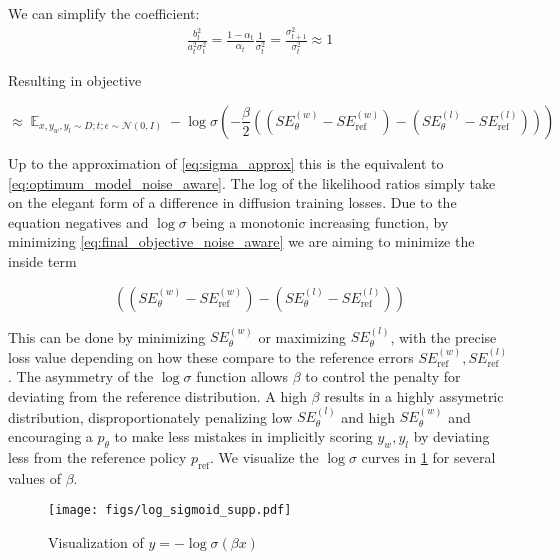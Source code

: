 \documentclass[10pt,twocolumn,letterpaper]{article}
\newcommand{\pref}{p_{\text{ref}}}
\begin{document}
We can simplify the coefficient:
\begin{align}\label{eq:sigma_approx}
\frac{b_t^2}{a_t^2 \sigma_t^2} =  \frac{1 - \alpha_t}{\alpha_t}\frac{1}{\sigma_t^2} = \frac{\sigma^2_{t+1}}{\sigma^2_t}
\approx 1\end{align}

Resulting in objective

\begin{equation}\label{eq:final_objective_noise_aware}
    \approx \mathop{\mathbb{E}}_{x,y_w,y_l \sim D; t; \epsilon \sim \mathcal{N}(0, I)}   
    - \log \sigma \left( -  \frac{\beta}{2} \left( (SE_\theta^{(w)} - SE_{\text{ref}}^{(w)} ) - (SE_\theta^{(l)} - SE_{\text{ref}}^{(l)} ) \right)    \right) 
\end{equation}

Up to the approximation of \cref{eq:sigma_approx} this is the equivalent to \cref{eq:optimum_model_noise_aware}. The log of the likelihood ratios simply take on the elegant form of a difference in diffusion training losses. Due to the equation negatives and $\log \sigma$  being a monotonic increasing function, by minimizing \cref{eq:final_objective_noise_aware} we  are aiming to minimize the inside term

\begin{equation}
    \left( (SE_\theta^{(w)} - SE_{\text{ref}}^{(w)} ) - (SE_\theta^{(l)} - SE_{\text{ref}}^{(l)} ) \right)
\end{equation}

This can be done by minimizing $SE_\theta^{(w)}$ or maximizing $SE_\theta^{(l)}$, with the precise loss value depending on how these compare to the reference errors $SE_{\text{ref}}^{(w)}, SE_{\text{ref}}^{(l)}$. 
The asymmetry of the $\log\sigma$ function allows $\beta$ to control the penalty for deviating from the reference distribution. A high $\beta$ results in a highly assymetric distribution, disproportionately penalizing low $SE_\theta^{(l)}$ and high $SE_\theta^{(w)}$ and encouraging a $p_\theta$ to make less mistakes in implicitly scoring $y_w, y_l$ by deviating less from the reference policy $\pref$. We visualize the $\log\sigma$ curves in \cref{fig:log_sigmoid_supp} for several values of $\beta$.

\begin{figure}[h]
  \centering
\texttt{[image: figs/log\_sigmoid\_supp.pdf]}

   \caption{
   Visualization of $y = - \log \sigma (\beta x)$
   }
   \label{fig:log_sigmoid_supp}
\end{figure}
\end{document}
